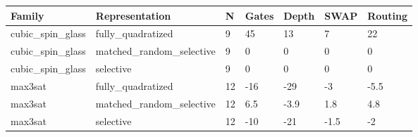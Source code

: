 \begin{tabular}{lllllll}
\hline
Family & Representation & N & Gates & Depth & SWAP & Routing \\
\hline
cubic\_spin\_glass & fully\_quadratized & 9 & 45 & 13 & 7 & 22 \\
cubic\_spin\_glass & matched\_random\_selective & 9 & 0 & 0 & 0 & 0 \\
cubic\_spin\_glass & selective & 9 & 0 & 0 & 0 & 0 \\
max3sat & fully\_quadratized & 12 & -16 & -29 & -3 & -5.5 \\
max3sat & matched\_random\_selective & 12 & 6.5 & -3.9 & 1.8 & 4.8 \\
max3sat & selective & 12 & -10 & -21 & -1.5 & -2 \\
\hline
\end{tabular}
